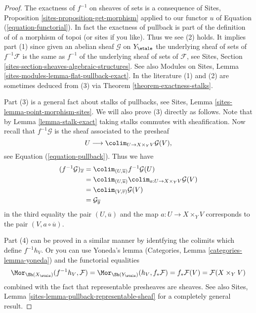 \begin{proof}
The exactness of $f^{-1}$ on sheaves of sets is a consequence of
Sites, Proposition \ref{sites-proposition-get-morphism}
applied to our functor $u$ of Equation (\ref{equation-functorial}).
In fact the exactness of pullback is part of the definition of
of a morphism of topoi (or sites if you like). Thus we see (2) holds.
It implies part (1) since given an abelian sheaf $\mathcal{G}$ on
$Y_\etale$
the underlying sheaf of sets of $f^{-1}\mathcal{F}$ is the same
as $f^{-1}$ of the underlying sheaf of sets of $\mathcal{F}$, see
Sites, Section \ref{sites-section-sheaves-algebraic-structures}.
See also
Modules on Sites, Lemma \ref{sites-modules-lemma-flat-pullback-exact}.
In the literature (1) and (2) are sometimes deduced from (3) via
Theorem \ref{theorem-exactness-stalks}.

\medskip\noindent
Part (3) is a general fact about stalks of pullbacks, see
Sites, Lemma \ref{sites-lemma-point-morphism-sites}.
We will also prove (3) directly as follows. Note that by
Lemma \ref{lemma-stalk-exact}
taking stalks commutes with sheafification.
Now recall that $f^{-1}\mathcal{G}$ is the sheaf
associated to the presheaf
$$
U \longrightarrow \colim_{U \to X \times_Y V} \mathcal{G}(V),
$$
see Equation (\ref{equation-pullback}).
Thus we have
\begin{align*}
(f^{-1}\mathcal{G})_{\overline{x}}
& = \colim_{(U, \overline{u})} f^{-1}\mathcal{G}(U) \\
& = \colim_{(U, \overline{u})}
\colim_{a : U \to X \times_Y V} \mathcal{G}(V) \\
& = \colim_{(V, \overline{v})} \mathcal{G}(V) \\
& = \mathcal{G}_{\overline{y}}
\end{align*}
in the third equality the pair $(U, \overline{u})$ and the map
$a : U \to X \times_Y V$ corresponds to the pair $(V, a \circ \overline{u})$.

\medskip\noindent
Part (4) can be proved in a similar manner by identfying the colimits
which define $f^{-1}h_V$. Or you can use
Yoneda's lemma (Categories, Lemma \ref{categories-lemma-yoneda})
and the functorial equalities
$$
\Mor_{\Sh(X_\etale)}(f^{-1}h_V, \mathcal{F}) =
\Mor_{\Sh(Y_\etale)}(h_V, f_*\mathcal{F}) =
f_*\mathcal{F}(V) = \mathcal{F}(X \times_Y V)
$$
combined with the fact that representable presheaves are sheaves. See also
Sites, Lemma \ref{sites-lemma-pullback-representable-sheaf}
for a completely general result.
\end{proof}

